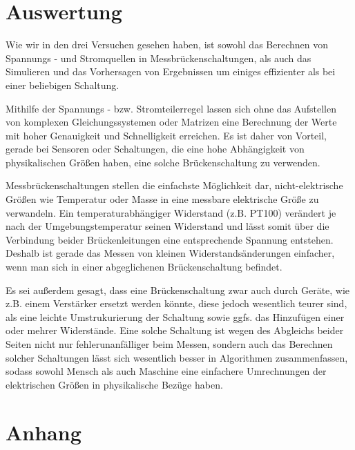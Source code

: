 \documentclass{scrarticle}
\begin{document}
\section{Auswertung}
Wie wir in den drei Versuchen gesehen haben, ist sowohl das Berechnen von Spannungs - und Stromquellen in Messbrückenschaltungen,
als auch das Simulieren und das Vorhersagen von Ergebnissen um einiges effizienter als bei einer beliebigen Schaltung. 
 
Mithilfe der Spannungs - bzw. Stromteilerregel lassen sich ohne das Aufstellen von komplexen
Gleichungssystemen oder Matrizen eine Berechnung der Werte mit hoher Genauigkeit und Schnelligkeit erreichen. Es ist daher von Vorteil, gerade bei Sensoren oder Schaltungen, die eine hohe Abhängigkeit von physikalischen Größen haben, eine solche Brückenschaltung zu verwenden.


Messbrückenschaltungen stellen die einfachste Möglichkeit dar, nicht-elektrische Größen wie Temperatur oder Masse in eine messbare elektrische Größe zu verwandeln.
Ein temperaturabhängiger Widerstand (z.B. PT100) verändert je nach der Umgebungstemperatur seinen Widerstand und lässt somit über die Verbindung beider Brückenleitungen eine entsprechende Spannung entstehen. 
Deshalb ist gerade das Messen von kleinen Widerstandsänderungen einfacher, wenn man sich in einer abgeglichenen Brückenschaltung befindet.

Es sei außerdem gesagt, dass eine Brückenschaltung zwar auch durch Geräte, wie z.B. einem Verstärker ersetzt werden könnte, diese jedoch wesentlich teurer sind, als eine leichte Umstrukurierung der Schaltung sowie ggfs. das Hinzufügen einer oder mehrer Widerstände.
Eine solche Schaltung ist wegen des Abgleichs beider Seiten nicht nur fehlerunanfälliger beim Messen, sondern auch das Berechnen solcher Schaltungen lässt sich wesentlich besser in Algorithmen zusammenfassen,
sodass sowohl Mensch als auch Maschine eine einfachere Umrechnungen der elektrischen Größen in physikalische Bezüge haben.
\newpage
\section{Anhang}
\end{document}
